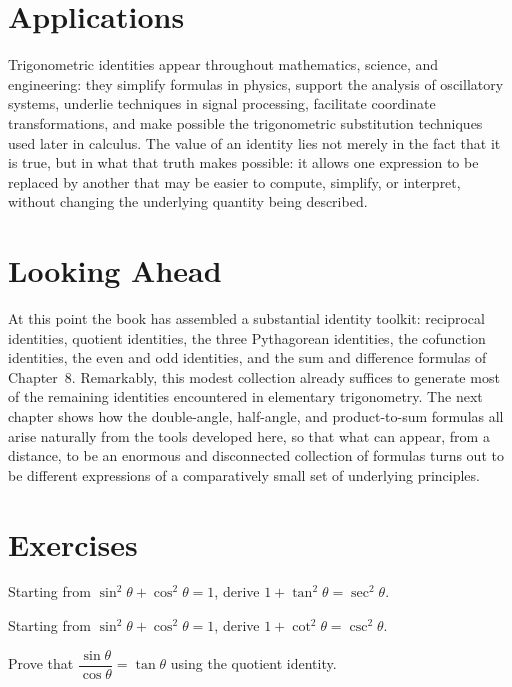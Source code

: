 \section{Applications}

Trigonometric identities appear throughout mathematics, science, and
engineering: they simplify formulas in physics, support the analysis of
oscillatory systems, underlie techniques in signal processing, facilitate
coordinate transformations, and make possible the trigonometric
substitution techniques used later in calculus. The value of an identity
lies not merely in the fact that it is true, but in what that truth makes
possible: it allows one expression to be replaced by another that may be
easier to compute, simplify, or interpret, without changing the underlying
quantity being described.

\section{Looking Ahead}

At this point the book has assembled a substantial identity toolkit:
reciprocal identities, quotient identities, the three Pythagorean
identities, the cofunction identities, the even and odd identities, and the
sum and difference formulas of Chapter~8. Remarkably, this modest
collection already suffices to generate most of the remaining identities
encountered in elementary trigonometry. The next chapter shows how the
double-angle, half-angle, and product-to-sum formulas all arise naturally
from the tools developed here, so that what can appear, from a distance, to
be an enormous and disconnected collection of formulas turns out to be
different expressions of a comparatively small set of underlying
principles.

\section{Exercises}
\begin{exercise}
Starting from $\sin^2\theta + \cos^2\theta = 1$, derive $1 + \tan^2\theta =
\sec^2\theta$.
\end{exercise}

\begin{exercise}
Starting from $\sin^2\theta + \cos^2\theta = 1$, derive $1 + \cot^2\theta =
\csc^2\theta$.
\end{exercise}

\begin{exercise}
Prove that $\dfrac{\sin\theta}{\cos\theta} = \tan\theta$ using the quotient
identity.
\end{exercise}

